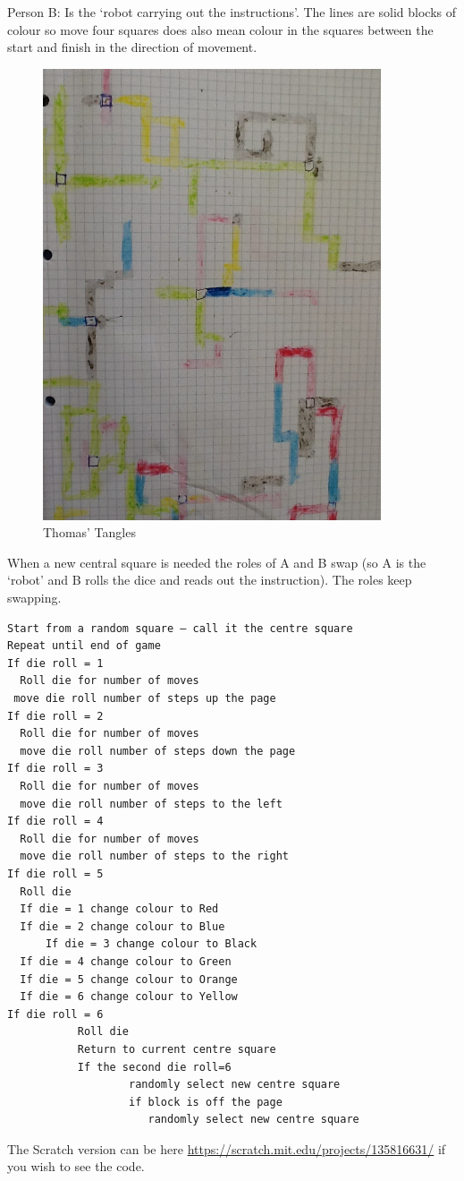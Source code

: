 Person B: Is the ‘robot carrying out the instructions'. The lines are solid blocks of colour so move four squares does also mean colour in the squares between the start and finish in the direction of movement.

\begin{figure}
    \centering
    \includegraphics[width=10cm]{chapters/chapterCT1/figures/tt1.JPG}
    \caption{Thomas' Tangles}
    \label{fig:ThomasTangles1}
\end{figure}

When a new central square is needed the roles of A and B swap (so A is the ‘robot’ and B rolls the dice and reads out the instruction). The roles keep swapping.

\begin{lstlisting}
Start from a random square – call it the centre square
Repeat until end of game
If die roll = 1
  Roll die for number of moves
 move die roll number of steps up the page
If die roll = 2
  Roll die for number of moves
  move die roll number of steps down the page
If die roll = 3
  Roll die for number of moves
  move die roll number of steps to the left 
If die roll = 4
  Roll die for number of moves
  move die roll number of steps to the right
If die roll = 5
  Roll die
  If die = 1 change colour to Red
  If die = 2 change colour to Blue
      If die = 3 change colour to Black
  If die = 4 change colour to Green
  If die = 5 change colour to Orange
  If die = 6 change colour to Yellow
If die roll = 6
           Roll die
           Return to current centre square
           If the second die roll=6
                   randomly select new centre square
                   if block is off the page
                      randomly select new centre square
\end{lstlisting}

The Scratch version can be here \url{https://scratch.mit.edu/projects/135816631/} if you wish to see the code.

